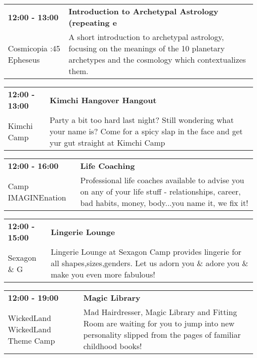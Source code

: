 \begin{tabular}{ p{1in} p{2.2in} }
    \textbf{12:00 - 13:00} & \textbf{Introduction to Archetypal Astrology (repeating e} \\
    Cosmicopia \newline 3:45 Epheseus & A short introduction to archetypal astrology, focusing on the meanings of the 10 planetary archetypes and the cosmology which contextualizes them. \\
    \hline 
\end{tabular}
    
\begin{tabular}{ p{1in} p{2.2in} }
    \textbf{12:00 - 13:00} & \textbf{Kimchi Hangover Hangout} \\
    Kimchi Camp \newline  & Party a bit too hard last night? Still wondering what your name is? Come for a spicy slap in the face and get yur gut straight at Kimchi Camp \\
    \hline 
\end{tabular}
    
\begin{tabular}{ p{1in} p{2.2in} }
    \textbf{12:00 - 16:00} & \textbf{Life Coaching} \\
    Camp IMAGINEnation \newline  & Professional life coaches available to advise you on any of your life stuff - relationships, career, bad habits, money, body...you name it, we fix it! \\
    \hline 
\end{tabular}
    
\begin{tabular}{ p{1in} p{2.2in} }
    \textbf{12:00 - 15:00} & \textbf{Lingerie Lounge} \\
    Sexagon \newline 430 \& G & Lingerie Lounge at Sexagon Camp provides lingerie for all shapes,sizes,genders. Let us adorn you \& adore you \& make you even more fabulous! \\
    \hline 
\end{tabular}
    
\begin{tabular}{ p{1in} p{2.2in} }
    \textbf{12:00 - 19:00} & \textbf{Magic Library} \\
    WickedLand \newline WickedLand Theme Camp & Mad Hairdresser, Magic Library and Fitting Room are waiting for you to jump into new personality slipped from the pages of familiar childhood books! \\
    \hline 
\end{tabular}
    
